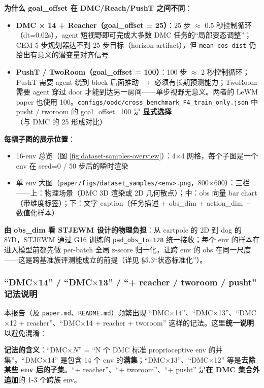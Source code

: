 \documentclass[11pt,a4paper]{article}
\begin{document}
\textbf{为什么 goal\_offset 在 DMC/Reach/PushT 之间不同}：
\begin{itemize}[leftmargin=2em]
    \item \textbf{DMC × 14 + Reacher（goal\_offset = 25）}：25 步 $\approx$ 0.5 秒控制循环（dt=0.02s），agent 短视野即可完成大多数 DMC 任务的``局部姿态调整''；CEM 5 步规划器达不到 25 步目标（horizon artifact），但 \texttt{mean\_cos\_dist} 仍给出有意义的潜变量对齐信号
    \item \textbf{PushT / TwoRoom（goal\_offset = 100）}：100 步 $\approx$ 2 秒控制循环；PushT 需要 agent 绕到 block 后面推动 $\rightarrow$ 必须有长期预测能力；TwoRoom 需要 agent 穿过 door 才能到达另一房间——单步视野无意义。两者的 LeWM paper 也使用 100。\texttt{configs/oodc/cross\_benchmark\_F4\_train\_only.json} 中 pusht / tworoom 的 goal\_offset=100 是 \textbf{显式选择}（与 DMC 的 25 形成对比）
\end{itemize}

\textbf{每幅子图的展示位置}：
\begin{itemize}[leftmargin=2em]
    \item 16-env 总览（图 \ref{fig:dataset-samples-overview}）：4×4 网格，每个子图是一个 env 在 seed=0 / 50 步后的瞬时渲染
    \item 单 env 大图（\texttt{paper/figs/dataset\_samples/<env>.png}，800×600）：三栏——上：物理场景（DMC 3D 渲染或 2D 几何散点）；中：obs 向量 bar chart（带维度标签）；下：文字 caption（任务描述 + obs\_dim + action\_dim + 数值化样本）
\end{itemize}

\textbf{由 obs\_dim 看 STJEWM 设计的物理负担}：从 cartpole 的 2D 到 dog 的 87D，STJEWM 通过 G16 训练的 \texttt{pad\_obs\_to=128} 统一接收；每个 env 的样本在进入模型前都先做 per-batch 全局 z-score 归一化，让跨 env 的 obs 在同一尺度——这是跨基准族评测能成立的前提（详见 §5.3``状态标准化''）。

\subsubsection{``DMC$\times$14'' / ``DMC$\times$13'' / ``+ reacher / tworoom / pusht'' 记法说明}

本报告（及 \texttt{paper.md}、\texttt{README.md}）频繁出现 ``DMC$\times$14''、``DMC$\times$13''、``DMC$\times$12 + reacher''、``DMC$\times$14 + reacher + tworoom'' 这样的记法。这里\textbf{统一说明}以避免混淆：

\textbf{记法的含义}：``DMC$\times N$'' = ``N 个 DMC 标准 proprioceptive env 的并集''。``DMC$\times$14'' 是包含 14 个 env 的\textbf{满集}；``DMC$\times$13''、``DMC$\times$12'' 等是\textbf{去除某些 env 后的子集}。``+ reacher''、``+ tworoom''、``+ pusht'' 是\textbf{在 DMC 集合外追加}的 1-3 个跨族 env。
\end{document}
